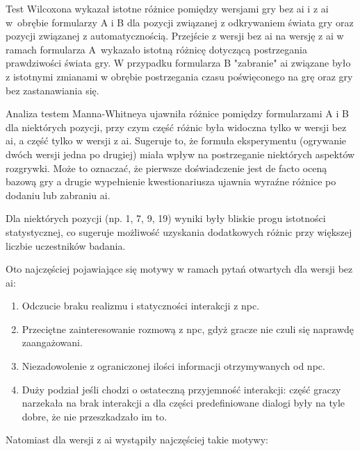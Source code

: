 \newpage

Test Wilcoxona wykazał istotne różnice pomiędzy wersjami gry bez \gls{ai} i z \gls{ai} w~obrębie formularzy A i B
dla pozycji związanej z odkrywaniem świata gry oraz pozycji związanej z automatycznością. Przejście z
wersji bez \gls{ai} na wersję z \gls{ai} w ramach formularza A~wykazało istotną różnicę dotyczącą postrzegania
prawdziwości świata gry. W przypadku formularza B "zabranie" \gls{ai} związane było z istotnymi zmianami
w obrębie postrzegania czasu poświęconego na grę oraz gry bez zastanawiania się.

Analiza testem Manna-Whitneya ujawniła różnice pomiędzy formularzami A i B dla niektórych pozycji, przy
czym część różnic była widoczna tylko w wersji bez \gls{ai}, a część tylko w wersji z \gls{ai}. Sugeruje to, że formuła
eksperymentu (ogrywanie dwóch wersji jedna po drugiej) miała wpływ na postrzeganie niektórych aspektów
rozgrywki. Może to oznaczać, że pierwsze doświadczenie jest de facto oceną bazową gry a drugie wypełnienie
kwestionariusza ujawnia wyraźne różnice po dodaniu lub zabraniu \gls{ai}.

Dla niektórych pozycji (np. 1, 7, 9, 19) wyniki były bliskie progu istotności statystycznej, co
sugeruje możliwość uzyskania dodatkowych różnic przy większej liczbie uczestników badania.

\vspace{10pt}

Oto najczęściej pojawiające się motywy w ramach pytań otwartych dla wersji bez \gls{ai}:

\begin{enumerate}
    \item Odczucie braku realizmu i statyczności interakcji z \gls{npc}.
    \item Przeciętne zainteresowanie rozmową z \gls{npc}, gdyż gracze nie czuli się naprawdę zaangażowani.
    \item Niezadowolenie z ograniczonej ilości informacji otrzymywanych od \gls{npc}.
    \item Duży podział jeśli chodzi o ostateczną przyjemność interakcji: część graczy
          narzekała na brak interakcji a dla części predefiniowane dialogi były na tyle dobre,
          że nie przeszkadzało im to.
\end{enumerate}

Natomiast dla wersji z \gls{ai} wystąpiły najczęściej takie motywy:

